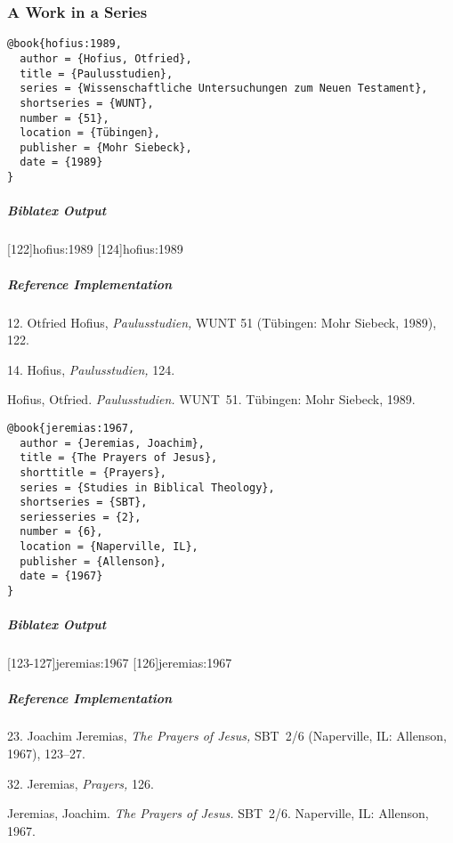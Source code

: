 \documentclass[a4paper]{article}
\newenvironment{biboutput}{%
  \subparagraph{Biblatex Output}
}{\color{black}}
\newenvironment{refimp}{%
  \subparagraph{Reference Implementation}
  \color{reference-colour}
  \rm
}{\par\color{black}}
\begin{document}
\subsubsection{A Work in a Series}

\begin{lstlisting}
@book{hofius:1989,
  author = {Hofius, Otfried},
  title = {Paulusstudien},
  series = {Wissenschaftliche Untersuchungen zum Neuen Testament},
  shortseries = {WUNT},
  number = {51},
  location = {Tübingen},
  publisher = {Mohr Siebeck},
  date = {1989}
}
\end{lstlisting}  

\begin{biboutput}
  [122]{hofius:1989}
  [124]{hofius:1989}
\end{biboutput}

\begin{refimp}
  \hspace*{\bibindent}12. Otfried Hofius, \emph{Paulusstudien,} WUNT 51
  (Tübingen: Mohr Siebeck, 1989), 122.

  \hspace*{\bibindent}14. Hofius, \emph{Paulusstudien,} 124.

  Hofius, Otfried. \emph{Paulusstudien.} WUNT~51. Tübingen: Mohr Siebeck,
  1989.
  
\end{refimp}

\medskip

\begin{lstlisting}
@book{jeremias:1967,
  author = {Jeremias, Joachim},
  title = {The Prayers of Jesus},
  shorttitle = {Prayers},
  series = {Studies in Biblical Theology},
  shortseries = {SBT},
  seriesseries = {2},
  number = {6},
  location = {Naperville, IL},
  publisher = {Allenson},
  date = {1967}
}
\end{lstlisting}

\begin{biboutput}
  [123-127]{jeremias:1967}
  [126]{jeremias:1967}
\end{biboutput}

\begin{refimp}
  \hspace*{\bibindent}23. Joachim Jeremias, \emph{The Prayers of Jesus,}
  SBT~2/6 (Naperville, IL: Allenson, 1967), 123–27. 

  \hspace*{\bibindent}32. Jeremias, \emph{Prayers,} 126.

  \hangindent\bibindent Jeremias, Joachim. \emph{The Prayers of Jesus.}
  SBT~2/6. Naperville, IL: Allenson, 1967.

\end{refimp}
\end{document}
